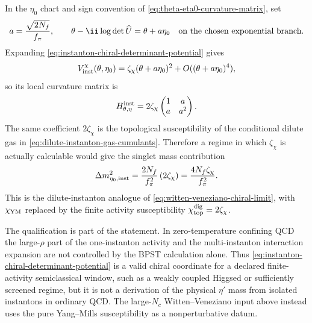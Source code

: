 \begin{controlledapproximation}
In the \(\eta_0\) chart and sign convention of
\eqref{eq:theta-eta0-curvature-matrix}, set
\[
  a=\frac{\sqrt{2N_f}}{f_\pi},
  \qquad
  \theta-\ii\log\det\widehat U
  =
  \theta+a\eta_0
  \quad\hbox{on the chosen exponential branch}.
\]
Expanding \eqref{eq:instanton-chiral-determinant-potential} gives
\begin{equation}
  V_{\rm inst}^{\chi}(\theta,\eta_0)
  =
  \zeta_\chi(\theta+a\eta_0)^2
  +O((\theta+a\eta_0)^4),
  \label{eq:instanton-chiral-determinant-quadratic}
\end{equation}
so its local curvature matrix is
\begin{equation}
  H_{\theta,\eta}^{\rm inst}
  =
  2\zeta_\chi
  \begin{pmatrix}
    1&a\\
    a&a^2
  \end{pmatrix}.
  \label{eq:instanton-chiral-curvature-matrix}
\end{equation}
The same coefficient \(2\zeta_\chi\) is the topological susceptibility of the
conditional dilute gas in
\eqref{eq:dilute-instanton-gas-cumulants}.  Therefore a regime in which
\(\zeta_\chi\) is actually calculable would give the singlet mass contribution
\begin{equation}
  \Delta m_{\eta_0,{\rm inst}}^2
  =
  \frac{2N_f}{f_\pi^2}\,(2\zeta_\chi)
  =
  \frac{4N_f\zeta_\chi}{f_\pi^2}.
  \label{eq:instanton-dilute-singlet-mass-contribution}
\end{equation}
This is the dilute-instanton analogue of
\eqref{eq:witten-veneziano-chiral-limit}, with
\(\chi_{\rm YM}\) replaced by the finite activity susceptibility
\(\chi_{\rm top}^{\rm dig}=2\zeta_\chi\).

The qualification is part of the statement.  In zero-temperature confining
QCD the large-\(\rho\) part of the one-instanton activity and the
multi-instanton interaction expansion are not controlled by the BPST
calculation alone.  Thus \eqref{eq:instanton-chiral-determinant-potential} is
a valid chiral coordinate for a declared finite-activity semiclassical window,
such as a weakly coupled Higgsed or sufficiently screened regime, but it is
not a derivation of the physical \(\eta'\) mass from isolated instantons in
ordinary QCD.  The large-\(N_c\) Witten--Veneziano input above instead uses
the pure Yang--Mills susceptibility as a nonperturbative datum.
\end{controlledapproximation}

